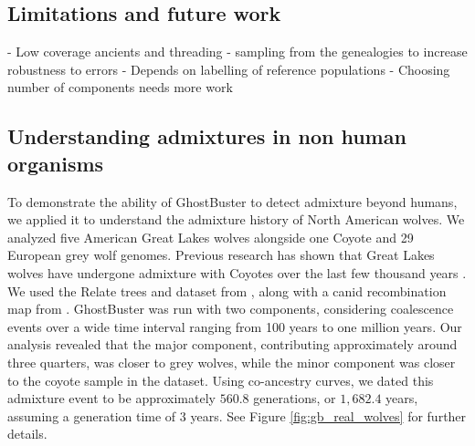 \subsection{Limitations and future work}
- Low coverage ancients and threading
- sampling from the genealogies to increase robustness to errors
- Depends on labelling of reference populations 
- Choosing number of components needs more work

\subsection{Understanding admixtures in non human organisms}
To demonstrate the ability of GhostBuster to detect admixture beyond humans, we applied it to understand the admixture history of North American wolves. We analyzed five American Great Lakes wolves alongside one Coyote and 29 European grey wolf genomes. Previous research has shown that Great Lakes wolves have undergone admixture with Coyotes over the last few thousand years \cite{lehman1991introgression,bozarth2011coyote,vonholdt2016whole}. We used the Relate trees and dataset from \cite{bergstrom2022grey}, along with a canid recombination map from \cite{auton2013genetic}. GhostBuster was run with two components, considering coalescence events over a wide time interval ranging from 100 years to one million years. Our analysis revealed that the major component, contributing approximately around three quarters, was closer to grey wolves, while the minor component was closer to the coyote sample in the dataset. Using co-ancestry curves, we dated this admixture event to be approximately $560.8$ generations, or $1{,}682.4$ years, assuming a generation time of 3 years. See Figure \ref{fig:gb_real_wolves} for further details.

